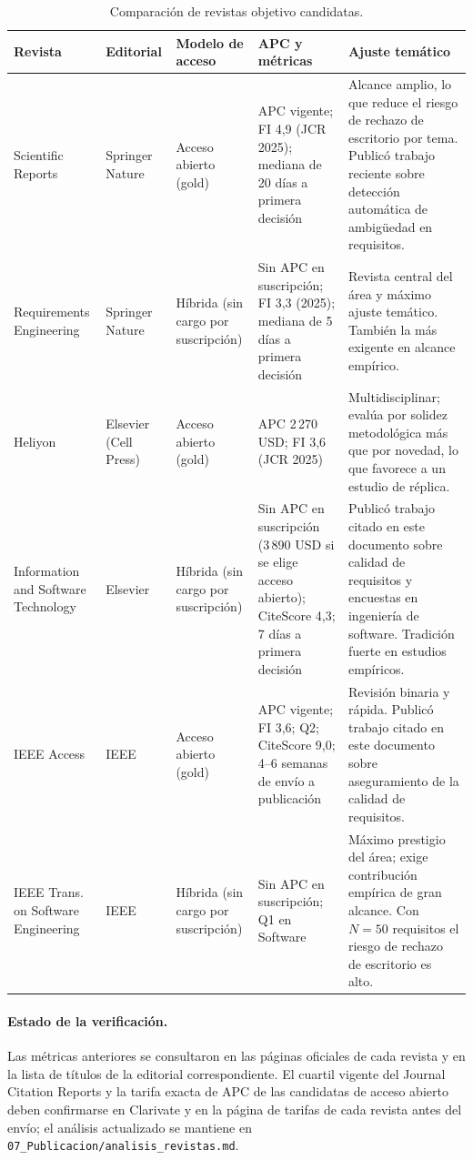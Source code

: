 \documentclass[journal,onecolumn]{IEEEtran}
\begin{document}
	\begin{table}[H]
		\centering
		\caption{Comparación de revistas objetivo candidatas.}
		\label{tab:revistas}
		\small
		\begin{tabularx}{\textwidth}{@{}p{3.0cm} p{1.7cm} p{1.5cm} p{2.4cm} X@{}}
			\toprule
			\textbf{Revista} & \textbf{Editorial} & \textbf{Modelo de acceso} & \textbf{APC y métricas} & \textbf{Ajuste temático} \\
			\midrule
			Scientific Reports & Springer Nature & Acceso abierto (gold) & APC vigente; FI 4,9 (JCR 2025); mediana de 20 días a primera decisión & Alcance amplio, lo que reduce el riesgo de rechazo de escritorio por tema. Publicó trabajo reciente sobre detección automática de ambigüedad en requisitos. \\
			\addlinespace
			Requirements Engineering & Springer Nature & Híbrida (sin cargo por suscripción) & Sin APC en suscripción; FI 3,3 (2025); mediana de 5 días a primera decisión & Revista central del área y máximo ajuste temático. También la más exigente en alcance empírico. \\
			\addlinespace
			Heliyon & Elsevier (Cell Press) & Acceso abierto (gold) & APC 2\,270 USD; FI 3,6 (JCR 2025) & Multidisciplinar; evalúa por solidez metodológica más que por novedad, lo que favorece a un estudio de réplica. \\
			\addlinespace
			Information and Software Technology & Elsevier & Híbrida (sin cargo por suscripción) & Sin APC en suscripción (3\,890 USD si se elige acceso abierto); CiteScore 4,3; 7 días a primera decisión & Publicó trabajo citado en este documento sobre calidad de requisitos y encuestas en ingeniería de software. Tradición fuerte en estudios empíricos. \\
			\addlinespace
			IEEE Access & IEEE & Acceso abierto (gold) & APC vigente; FI 3,6; Q2; CiteScore 9,0; 4--6 semanas de envío a publicación & Revisión binaria y rápida. Publicó trabajo citado en este documento sobre aseguramiento de la calidad de requisitos. \\
			\addlinespace
			IEEE Trans. on Software Engineering & IEEE & Híbrida (sin cargo por suscripción) & Sin APC en suscripción; Q1 en Software & Máximo prestigio del área; exige contribución empírica de gran alcance. Con $N = 50$ requisitos el riesgo de rechazo de escritorio es alto. \\
			\bottomrule
		\end{tabularx}
	\end{table}
	
	\paragraph{Estado de la verificación.}
	Las métricas anteriores se consultaron en las páginas oficiales de cada
	revista y en la lista de títulos de la editorial correspondiente. El cuartil
	vigente del Journal Citation Reports y la tarifa exacta de APC de las
	candidatas de acceso abierto deben confirmarse en Clarivate y en la página de
	tarifas de cada revista antes del envío; el análisis actualizado se mantiene
	en \texttt{07\_Publicacion/analisis\_revistas.md}.
	
\end{document}
